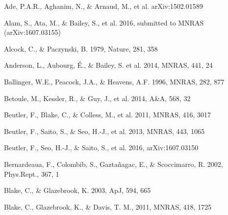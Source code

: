 \documentclass[iop]{emulateapj}
\begin{document}

\begin{thebibliography}{}

Ade, P.A.R., Aghanim, N., \& Arnaud, M., et al. arXiv:1502.01589

Alam, S., Ata, M., \& Bailey, S., et al. 2016,
submitted to MNRAS (arXiv:1607.03155)


Alcock, C., \& Paczynski, B. 1979, Nature, 281, 358  


Anderson, L., Aubourg, \'E., \& Bailey, S. et al. 2014, MNRAS, 441, 24  


Ballinger, W.E., Peacock, J.A., \& Heavens, A.F. 1996, MNRAS, 282, 877  

Betoule, M., Kessler, R., \& Guy, J., et al. 2014, A\&A, 568, 32


Beutler, F., Blake, C., \& Colless, M., et al. 2011, MNRAS, 416, 3017

Beutler, F., Saito, S., \& Seo, H.-J., et al. 2013, MNRAS, 443, 1065

Beutler, F., Seo, H.-J., \& Saito, S., et al. 2016,
arXiv:1607.03150

Bernardeaua, F., Colombib, S., Gaztañagac, E., \& Scoccimarro, R. 
2002, Phys.Rept., 367, 1

Blake, C., \& Glazebrook, K. 2003, ApJ, 594, 665


Blake, C., Glazebrook, K., \& Davis, T. M., 2011, MNRAS, 418, 1725  


\end{thebibliography}
\end{document}
